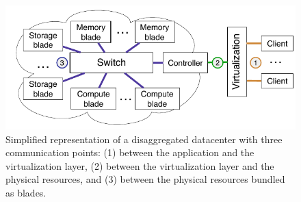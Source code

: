 \begin{figure}
    \centering
    \includegraphics[width=\columnwidth]{fig/ddc-overview}
    \caption{Simplified representation of a disaggregated datacenter with
    three communication points: (1) between the application and the
    virtualization layer,
    (2) between the virtualization layer and the physical resources, and (3)
    between the physical resources bundled as blades.}
    \label{fig:DDC}
\end{figure}

